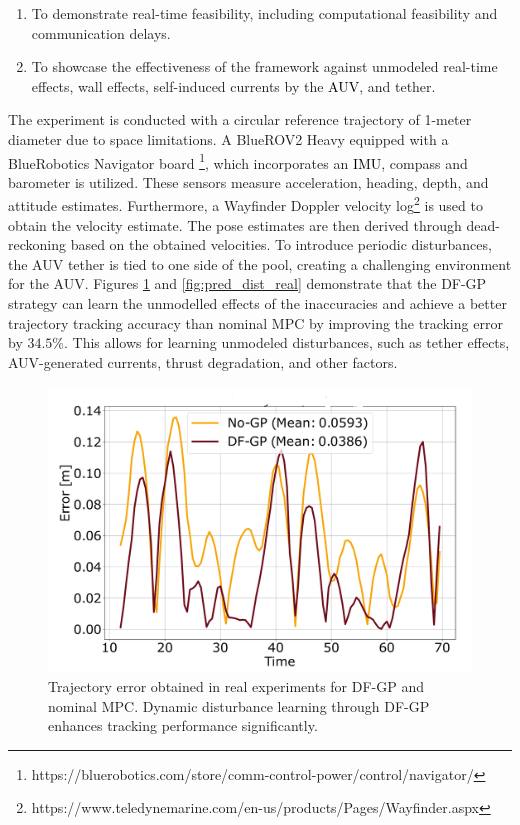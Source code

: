 \begin{enumerate}
    \item To demonstrate real-time feasibility, including computational feasibility and communication delays.
    \item To showcase the effectiveness of the framework against unmodeled real-time effects, wall effects, self-induced currents by the \textcolor{black}{\ac{AUV}}, and tether.
\end{enumerate}
The experiment is conducted with a circular reference trajectory of 1-meter diameter due to space limitations. A BlueROV2 Heavy equipped with a BlueRobotics Navigator board \footnote{https://bluerobotics.com/store/comm-control-power/control/navigator/}, which incorporates an \textcolor{black}{\ac{IMU}}, compass and barometer is utilized. These sensors measure acceleration, heading, depth, and attitude estimates. Furthermore, a Wayfinder Doppler velocity log\footnote{https://www.teledynemarine.com/en-us/products/Pages/Wayfinder.aspx} is used to obtain the velocity estimate. The pose estimates are then derived through dead-reckoning based on the obtained velocities. To introduce periodic disturbances, the \ac{AUV} tether is tied to one side of the pool, creating a challenging environment for the \ac{AUV}.  %
Figures \ref{fig:error-real} and \ref{fig:pred_dist_real} demonstrate that the \ac{DF-GP} strategy can learn the unmodelled effects of the inaccuracies and achieve a better trajectory tracking accuracy than nominal \ac{MPC} by improving the tracking error by $34.5\%$. This allows for learning unmodeled disturbances, such as tether effects, \ac{AUV}-generated currents, thrust degradation, and other factors.


\begin{figure}[b]
	\centering	\includegraphics[width=0.6\linewidth]{figures/error_real.pdf}
	\caption{Trajectory error obtained in real experiments for  \ac{DF-GP} and nominal \ac{MPC}. Dynamic disturbance learning through \ac{DF-GP} enhances tracking performance significantly.}
	\label{fig:error-real}
\end{figure}


